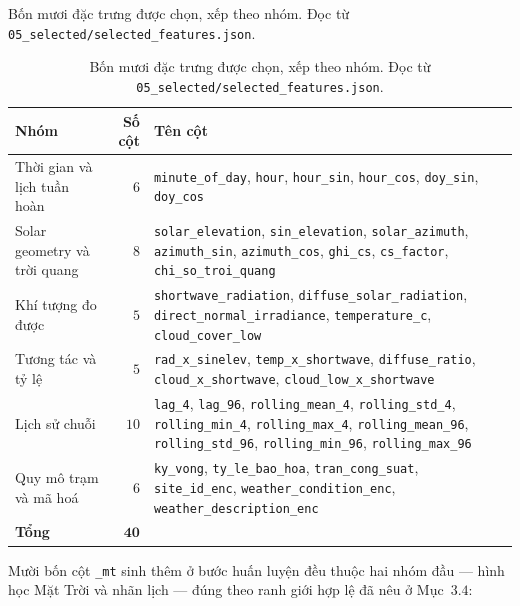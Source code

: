 \documentclass[12pt, a4paper]{report}
\begin{document}
\begin{table}[htbp]
\centering
\caption{Bốn mươi đặc trưng được chọn, xếp theo nhóm. Đọc từ
\texttt{05\_selected/selected\_features.json}.}
\label{tab:bo_dac_trung}
\small
\begin{tabular}{@{}L{4.0cm} r L{9.0cm}@{}}
\toprule
\textbf{Nhóm} & \textbf{Số cột} & \textbf{Tên cột} \\
\midrule
Thời gian và lịch tuần hoàn & $6$ &
\texttt{minute\_of\_day}, \texttt{hour}, \texttt{hour\_sin}, \texttt{hour\_cos},
\texttt{doy\_sin}, \texttt{doy\_cos} \\
\addlinespace
Solar geometry và trời quang & $8$ &
\texttt{solar\_elevation}, \texttt{sin\_elevation}, \texttt{solar\_azimuth},
\texttt{azimuth\_sin}, \texttt{azimuth\_cos}, \texttt{ghi\_cs}, \texttt{cs\_factor},
\texttt{chi\_so\_troi\_quang} \\
\addlinespace
Khí tượng đo được & $5$ &
\texttt{shortwave\_radiation}, \texttt{diffuse\_solar\_radiation},
\texttt{direct\_normal\_irradiance}, \texttt{temperature\_c}, \texttt{cloud\_cover\_low} \\
\addlinespace
Tương tác và tỷ lệ & $5$ &
\texttt{rad\_x\_sinelev}, \texttt{temp\_x\_shortwave}, \texttt{diffuse\_ratio},
\texttt{cloud\_x\_shortwave}, \texttt{cloud\_low\_x\_shortwave} \\
\addlinespace
Lịch sử chuỗi & $10$ &
\texttt{lag\_4}, \texttt{lag\_96}, \texttt{rolling\_mean\_4}, \texttt{rolling\_std\_4},
\texttt{rolling\_min\_4}, \texttt{rolling\_max\_4}, \texttt{rolling\_mean\_96},
\texttt{rolling\_std\_96}, \texttt{rolling\_min\_96}, \texttt{rolling\_max\_96} \\
\addlinespace
Quy mô trạm và mã hoá & $6$ &
\texttt{ky\_vong}, \texttt{ty\_le\_bao\_hoa}, \texttt{tran\_cong\_suat}, \texttt{site\_id\_enc},
\texttt{weather\_condition\_enc}, \texttt{weather\_description\_enc} \\
\midrule
\textbf{Tổng} & $\mathbf{40}$ & \\
\bottomrule
\end{tabular}
\caption[Bốn mươi đặc trưng được chọn, xếp theo nhóm]{Bốn mươi đặc trưng được chọn, xếp theo nhóm. Đọc từ
\texttt{05\_selected/selected\_features.json}.}
\label{tab:bo_dac_trung}
\end{table}

\enlargethispage{3\baselineskip}
Mười bốn cột \texttt{\_mt} sinh thêm ở bước huấn luyện đều thuộc hai nhóm đầu --- hình học Mặt Trời
và nhãn lịch --- đúng theo ranh giới hợp lệ đã nêu ở Mục~$3.4$:
\end{document}
